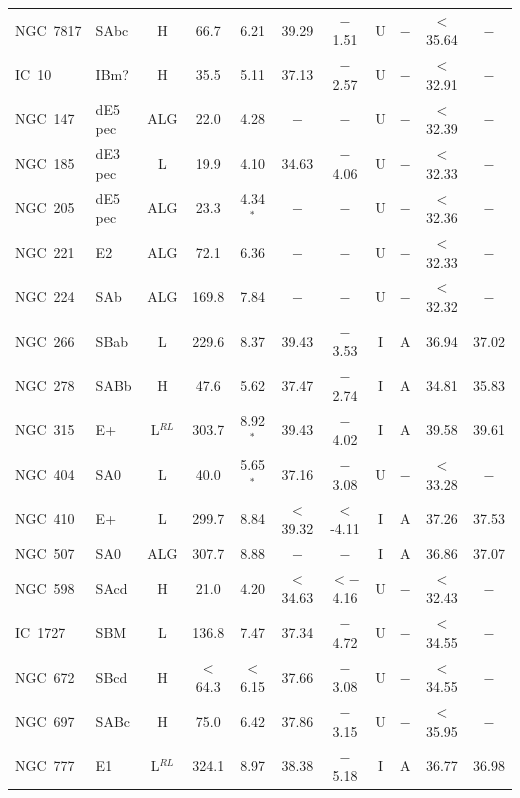\begin{center}
\begin{longtable}{lC{2.5cm}ccccccccc}
NGC~7817 & SAbc    & H          &66.7  & 6.21  &  39.29 & $-$1.51  &  U & $-$  & $<$35.64 & $-$ \\
IC~10 	  & IBm?      & H        &35.5  & 5.11  &   37.13 & $-$2.57 & U  & $-$  & $<$32.91 & $-$  \\
NGC~147   &  dE5 pec & ALG   &  22.0    & 4.28  &  $-$    &  $-$       &  U  & $-$     &  $<$32.39  & $-$ \\
NGC~185   & dE3 pec  &  L       &  19.9  & 4.10  & 34.63 &  $-$4.06 & U & $-$  &  $<$32.33 & $-$   \\
NGC~205   &  dE5 pec  & ALG  & 23.3    & 4.34$^{*}$ &  $-$    &  $-$  &U & $-$  &  $<$32.36 & $-$  \\
NGC~221   & E2           &  ALG  &  72.1   & 6.36  & $-$    &  $-$    &  U & $-$   &  $<$32.33 & $-$    \\
NGC~224   & SAb        &  ALG   &  169.8 & 7.84  & $-$    &  $-$   &   U & $-$   &  $<$32.32 & $-$ \\
NGC~266   & SBab      & L         &  229.6 & 8.37  & 39.43  & $-$3.53 &  I   & A  & 36.94  & 37.02 \\
NGC~278   & SABb      & H        &  47.6   & 5.62  & 37.47  & $-$2.74 & I    & A  &  34.81 & 35.83 \\
NGC~315   &  E+        &  L$^{RL}$        &  303.7  & 8.92$^{*}$ & 39.43 & $-$4.02  &  I   & A  & 39.58 &  39.61 \\
NGC~404   & SA0       &  L        & 40.0        & 5.65$^{*}$ & 37.16  & $-$3.08  & U  & $-$   & $<$33.28  &   $-$ \\
NGC~410   &  E+        &  L        & 299.7 &  8.84   & $<$39.32 &   $<$-4.11  & I   & A  & 37.26 &  37.53 \\
NGC~507   & SA0       &  ALG    & 307.7  & 8.88   &  $-$    &  $-$   &  I    & A   & 36.86  & 37.07  \\
NGC~598   & SAcd     &   H       &  21.0       &  4.20  &  $<$34.63  &  $<-$4.16  & U & $-$  & $<$32.43  & $-$  \\
IC~1727     & SBM      &   L        &  136.8  & 7.47   &  37.34    &  $-$4.72  &  U & $-$   &  $<$34.55 &  $-$  \\
NGC~672   &  SBcd    &  H        &  $<$64.3  & $<$6.15 &  37.66  & $-$3.08  &  U & $-$  &  $<$34.55  & $-$ \\
NGC~697   &  SABc    &  H        &  75.0     &  6.42     &  37.86    &  $-$3.15   &   U &  $-$  &   $<$35.95  &  $-$ \\
NGC~777   & E1         &  L$^{RL}$    &  324.1  & 8.97     & 38.38   & $-$5.18      &  I    & A      &  36.77 & 36.98  \\

\end{longtable}
\end{center}
